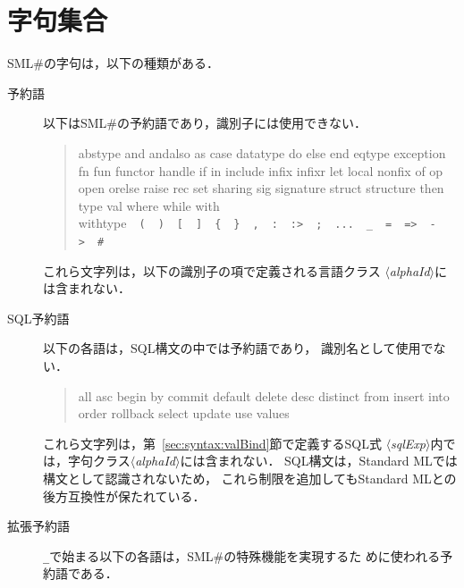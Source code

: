 \documentclass{jbook}
\newif\ifjp
\newcommand{\txt}[2]{#1}
\newcommand{\smlsharp}{SML\#}
\newcommand{\code}[1]{\mbox{\large\tt #1}}
\newcommand{\nonterm}[1]{\mbox{$\langle$}{\it #1}\mbox{$\rangle$}}
\begin{document}
\else%
\fi%

\section{\txt{字句集合}{Lexical items}}
\label{sec:lexicalItems}
\ifjp%

	\smlsharp{}の字句は，以下の種類がある．
\begin{description}
\item[予約語] 
	以下は\smlsharp{}の予約語であり，識別子には使用できない．

\begin{tt}
\begin{quote}
abstype
and
andalso
as
case
datatype
do
else
end
eqtype
exception
fn
fun
functor
handle
if
in
include
infix
infixr
let
local
nonfix
of
op
open
orelse
raise
rec
set
sharing
sig
signature
struct
structure
then
type
val
where
while
with
withtype\ \
\verb|(|\ \
\verb|)|\ \
\verb([(\ \
\verb(](\ \
\verb({(\ \
\verb(}(\ \
\verb(,(\ \
\verb(:(\ \
\verb(:>(\ \
\verb(;(\ \
\verb(...(\ \
\verb(_(\ \
\verb(=(\ \
\verb(=>(\ \
\verb(->(\ \
\verb(#(
\end{quote}
\end{tt}

	これら文字列は，以下の識別子の項で定義される言語クラス
\nonterm{alphaId}には含まれない．


\item[SQL予約語] 
	以下の各語は，SQL構文の中では予約語であり，
識別名として使用でない．

\begin{tt}
\begin{quote}
all
asc
begin
by
commit
default
delete
desc
distinct
from
insert
into
order
rollback
select
update
use
values
\end{quote}
\end{tt}

	これら文字列は，第~\ref{sec:syntax:valBind}節で定義するSQL式
\nonterm{sqlExp}内では，字句クラス\nonterm{alphaId}には含まれない．
	SQL構文は，Standard MLでは構文として認識されないため，
これら制限を追加してもStandard MLとの後方互換性が保たれている．

\item[拡張予約語] 
	\code{\_}で始まる以下の各語は，\smlsharp{}の特殊機能を実現するた
めに使われる予約語である．


\end{description}
\end{document}
